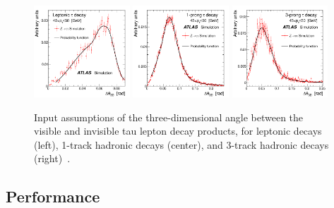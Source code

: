 \begin{figure}[tp]
  \centering
  \includegraphics[width=0.32\textwidth]{figures/ATLAS-CONF-2011-132/fig_01a}
  \includegraphics[width=0.32\textwidth]{figures/ATLAS-CONF-2011-132/fig_01b}
  \includegraphics[width=0.32\textwidth]{figures/ATLAS-CONF-2011-132/fig_01c}
  \caption{Input assumptions of the three-dimensional angle between the visible and invisible tau lepton decay products, for leptonic decays (left), 1-track hadronic decays (center), and 3-track hadronic decays (right)~\cite{ATLAS-CONF-2011-132}.}
  \label{fig:strategy-mtautau-inputs}
\end{figure}

\subsection{Performance}
\label{sec:strategy-mtautau-performance}

